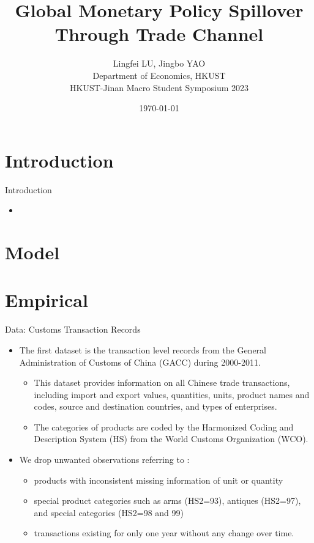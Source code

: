 \documentclass[10pt]{beamer}
\title[Global Monetary Policy Spillover Through Trade Channel]{Global Monetary Policy Spillover Through Trade Channel}
\author[Yao\&Lu (2023)]{\large Lingfei LU, Jingbo YAO \\ \vspace{0.5cm} Department of Economics, HKUST \\ \vspace{0.5cm} HKUST-Jinan Macro Student Symposium 2023}
\date{\today}
\begin{document}
	
    \begin{frame}[plain]
	\maketitle {}
    \end{frame}


\section{Introduction}

\begin{frame}{Introduction}
	\begin{itemize}
		\item 
	\end{itemize}
\end{frame}

\section{Model}

\section{Empirical}

\begin{frame}{Data: Customs Transaction Records}
	\begin{itemize}
		\item The first dataset is the transaction level records from the General Administration of Customs of China (GACC) during 2000-2011.
		\begin{itemize}
			\item This dataset provides information on
			all Chinese trade transactions, including import and export values, quantities, units, product names and codes, source and destination countries, and types of enterprises.
			\item The categories of products are coded by the Harmonized Coding and Description System (HS) from the World Customs Organization (WCO).
		\end{itemize}
		\item We drop unwanted observations referring to \cite{lmx2015}:
		\begin{itemize}
			\item products with inconsistent missing information of unit or quantity
			\item special product categories such as arms (HS2=93), antiques (HS2=97), and special categories (HS2=98 and 99)
			\item transactions existing for only one year without any change over time.
		\end{itemize}
	\end{itemize}
\end{frame}
\end{document}
